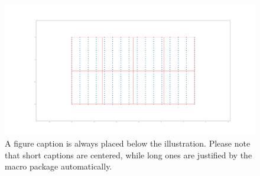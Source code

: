 \documentclass{llncs}
\begin{document}
\begin{figure}
\includegraphics[width=\textwidth]{./fig/batch_data}
\caption{A figure caption is always placed below the illustration.
Please note that short captions are centered, while long ones are
justified by the macro package automatically.} \label{fig1}
\end{figure}




\end{document}
